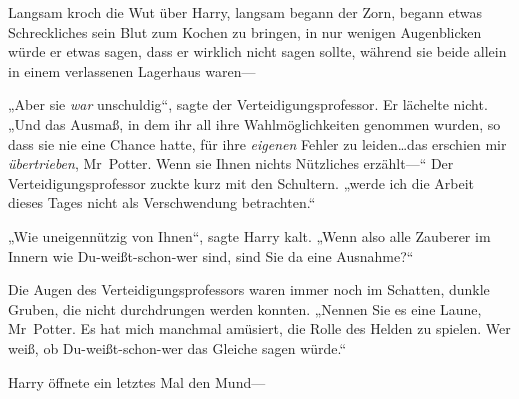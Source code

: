 Langsam kroch die Wut über Harry, langsam begann der Zorn, begann etwas Schreckliches sein Blut zum Kochen zu bringen, in nur wenigen Augenblicken würde er etwas sagen, dass er wirklich nicht sagen sollte, während sie beide allein in einem verlassenen Lagerhaus waren—

„Aber sie \emph{war} unschuldig“, sagte der Verteidigungsprofessor. Er lächelte nicht. „Und das Ausmaß, in dem ihr all ihre Wahlmöglichkeiten genommen wurden, so dass sie nie eine Chance hatte, für ihre \emph{eigenen} Fehler zu leiden…das erschien mir \emph{übertrieben}, Mr~Potter. Wenn sie Ihnen nichts Nützliches erzählt—“ Der Verteidigungsprofessor zuckte kurz mit den Schultern. „werde ich die Arbeit dieses Tages nicht als Verschwendung betrachten.“

„Wie uneigennützig von Ihnen“, sagte Harry kalt. „Wenn also alle Zauberer im Innern wie Du-weißt-schon-wer sind, sind Sie da eine Ausnahme?“

Die Augen des Verteidigungsprofessors waren immer noch im Schatten, dunkle Gruben, die nicht durchdrungen werden konnten. „Nennen Sie es eine Laune, Mr~Potter. Es hat mich manchmal amüsiert, die Rolle des Helden zu spielen. Wer weiß, ob Du-weißt-schon-wer das Gleiche sagen würde.“

Harry öffnete ein letztes Mal den Mund—

